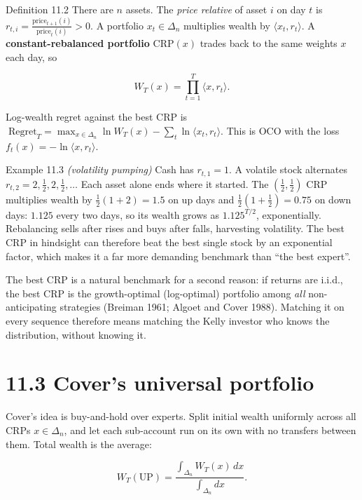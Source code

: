 \documentclass[11pt,a4paper,openany]{book}
\newcommand{\Reg}{\mathrm{Regret}}
\newcommand{\ip}[2]{\langle #1,#2\rangle}
\newcommand{\simplex}{\Delta}
\begin{document}
\begin{bdef}{Definition 11.2}
There are $n$ assets. The \emph{price relative} of asset $i$ on day $t$ is $r_{t,i}=\frac{\text{price}_{t+1}(i)}{\text{price}_t(i)}>0$. A portfolio $x_t\in\simplex_n$ multiplies wealth by $\ip{x_t}{r_t}$. A \textbf{constant-rebalanced portfolio} $\mathrm{CRP}(x)$ trades back to the same weights $x$ each day, so

\[W_T(x)=\prod_{t=1}^T\ip{x}{r_t}.\]

Log-wealth regret against the best CRP is $\;\Reg_T=\max_{x\in\simplex_n}\ln W_T(x)-\sum_t\ln\ip{x_t}{r_t}$. This is OCO with the loss $f_t(x)=-\ln\ip{x}{r_t}$.
\end{bdef}

\begin{bexample}{Example 11.3 \emph{(volatility pumping)}}
Cash has $r_{t,1}=1$. A volatile stock alternates $r_{t,2}=2,\tfrac12,2,\tfrac12,\dots$ Each asset alone ends where it started. The $(\tfrac12,\tfrac12)$ CRP multiplies wealth by $\tfrac12(1+2)=1.5$ on up days and $\tfrac12(1+\tfrac12)=0.75$ on down days: $1.125$ every two days, so its wealth grows as $1.125^{T/2}$, exponentially. Rebalancing sells after rises and buys after falls, harvesting volatility. The best CRP in hindsight can therefore beat the best single stock by an exponential factor, which makes it a far more demanding benchmark than ``the best expert''.
\end{bexample}

The best CRP is a natural benchmark for a second reason: if returns are i.i.d., the best CRP is the growth-optimal (log-optimal) portfolio among \emph{all} non-anticipating strategies (Breiman 1961; Algoet and Cover 1988). Matching it on every sequence therefore means matching the Kelly investor who knows the distribution, without knowing it.

\section*{11.3 Cover's universal portfolio}\label{ch11-cover}

Cover's idea is buy-and-hold over experts. Split initial wealth uniformly across all CRPs $x\in\simplex_n$, and let each sub-account run on its own with no transfers between them. Total wealth is the average:

\[W_T(\mathrm{UP})=\frac{\int_{\simplex_n}W_T(x)\,dx}{\int_{\simplex_n}dx}.\]
\end{document}
